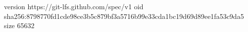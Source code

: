 version https://git-lfs.github.com/spec/v1
oid sha256:8798770fd1cde98ce3b5c879bf3a5716b99e33cda1bc19d69d89ee1fa53c9da5
size 65632
